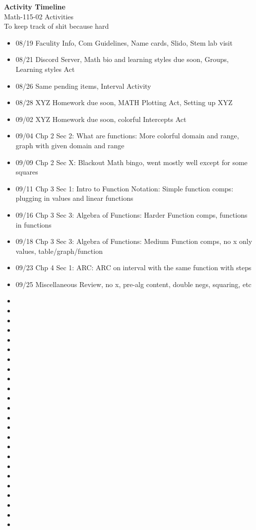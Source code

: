 \documentclass{article}
\begin{document}
\begin{center}
    \Large \textbf{Activity Timeline} \\
    \vspace{0.2cm}
    \normalsize Math-115-02 Activities\\
    \normalsize To keep track of shit because hard
\end{center}
\vspace{1cm} %
\begin{itemize}
    \item 08/19 Faculity Info, Com Guidelines, Name cards, Slido, Stem lab visit
    \item 08/21 Discord Server, Math bio and learning styles due soon, Groups, Learning styles Act 
    \item 08/26 Same pending items, Interval Activity
    \item 08/28 XYZ Homework due soon, MATH Plotting Act, Setting up XYZ
    \item 09/02 XYZ Homework due soon, colorful Intercepts Act
    \item 09/04 Chp 2 Sec 2: What are functions: More colorful domain and range, graph with given domain and range
    \item 09/09 Chp 2 Sec X: Blackout Math bingo, went mostly well except for some squares
    \item 09/11 Chp 3 Sec 1: Intro to Function Notation: Simple function comps: plugging in values and linear functions
    \item 09/16 Chp 3 Sec 3: Algebra of Functions: Harder Function comps, functions in functions
    \item 09/18 Chp 3 Sec 3: Algebra of Functions: Medium Function comps, no x only values, table/graph/function
    \item 09/23 Chp 4 Sec 1: ARC: ARC on interval with the same function with steps
    \item 09/25 Miscellaneous Review, no x, pre-alg content, double negs, squaring, etc
    \item 
    \item
    \item
    \item
    \item
    \item
    \item
    \item
    \item
    \item
    \item
    \item
    \item
    \item
    \item
    \item
    \item
    \item
    \item
    \item
    \item
    \item
    \item
    \item
\end{itemize}
\end{document}
